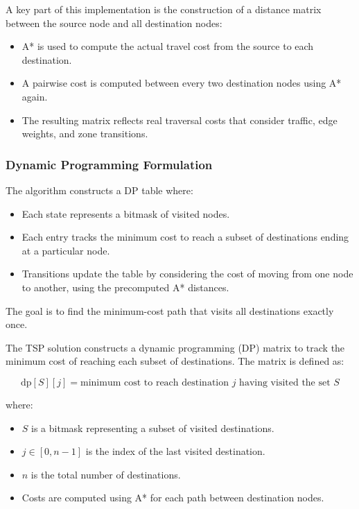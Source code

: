 \documentclass[12pt]{article}
\begin{document}
A key part of this implementation is the construction of a distance matrix between the source node and all destination nodes:
\begin{itemize}
    \item A* is used to compute the actual travel cost from the source to each destination.
    \item A pairwise cost is computed between every two destination nodes using A* again.
    \item The resulting matrix reflects real traversal costs that consider traffic, edge weights, and zone transitions.
\end{itemize}

\subsubsection*{Dynamic Programming Formulation}

The algorithm constructs a DP table where:
\begin{itemize}
    \item Each state represents a bitmask of visited nodes.
    \item Each entry tracks the minimum cost to reach a subset of destinations ending at a particular node.
    \item Transitions update the table by considering the cost of moving from one node to another, using the precomputed A* distances.
\end{itemize}

The goal is to find the minimum-cost path that visits all destinations exactly once.

The TSP solution constructs a dynamic programming (DP) matrix to track the minimum cost of reaching each subset of destinations. The matrix is defined as:

\[
\text{dp}[S][j] = \text{minimum cost to reach destination } j \text{ having visited the set } S
\]

where:
\begin{itemize}
    \item \( S \) is a bitmask representing a subset of visited destinations.
    \item \( j \in [0, n-1] \) is the index of the last visited destination.
    \item \( n \) is the total number of destinations.
    \item Costs are computed using A* for each path between destination nodes.
\end{itemize}
\end{document}
